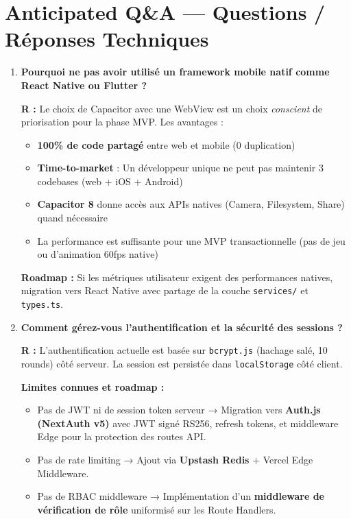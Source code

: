 \documentclass[12pt, a4paper]{article}
\begin{document}
\section{Anticipated Q\&A — Questions / Réponses Techniques}

\begin{enumerate}[leftmargin=2em, label=\textbf{Q\arabic*.}]

\item \textbf{Pourquoi ne pas avoir utilisé un framework mobile natif comme React Native ou Flutter ?}

\textbf{R :} Le choix de Capacitor avec une WebView est un choix \textit{conscient} de priorisation pour la phase MVP. Les avantages :
\begin{itemize}
  \item \textbf{100\% de code partagé} entre web et mobile (0 duplication)
  \item \textbf{Time-to-market} : Un développeur unique ne peut pas maintenir 3 codebases (web + iOS + Android)
  \item \textbf{Capacitor 8} donne accès aux APIs natives (Camera, Filesystem, Share) quand nécessaire
  \item La performance est suffisante pour une MVP transactionnelle (pas de jeu ou d'animation 60fps native)
\end{itemize}
\textbf{Roadmap :} Si les métriques utilisateur exigent des performances natives, migration vers React Native avec partage de la couche \texttt{services/} et \texttt{types.ts}.

\vspace{0.5em}

\item \textbf{Comment gérez-vous l'authentification et la sécurité des sessions ?}

\textbf{R :} L'authentification actuelle est basée sur \texttt{bcrypt.js} (hachage salé, 10 rounds) côté serveur. La session est persistée dans \texttt{localStorage} côté client.

\textbf{Limites connues et roadmap :}
\begin{itemize}
  \item Pas de JWT ni de session token serveur → Migration vers \textbf{Auth.js (NextAuth v5)} avec JWT signé RS256, refresh tokens, et middleware Edge pour la protection des routes API.
  \item Pas de rate limiting → Ajout via \textbf{Upstash Redis} + Vercel Edge Middleware.
  \item Pas de RBAC middleware → Implémentation d'un \textbf{middleware de vérification de rôle} uniformisé sur les Route Handlers.
\end{itemize}


\end{enumerate}
\end{document}
